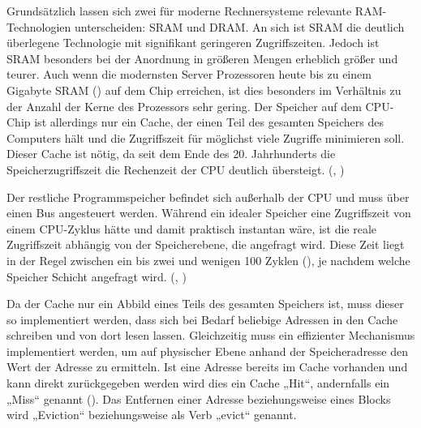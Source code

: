 Grundsätzlich lassen sich zwei für moderne Rechnersysteme
relevante \ac{RAM}-Tech\-no\-lo\-gien unterscheiden: \ac{SRAM} und
\ac{DRAM}.
An sich ist \ac{SRAM} die deutlich überlegene Technologie mit
signifikant geringeren Zugriffszeiten. Jedoch ist \ac{SRAM}
besonders bei der Anordnung in größeren Mengen erheblich größer
und teurer. Auch wenn die modernsten Server Prozessoren heute
bis zu einem Gigabyte \ac{SRAM} (\cite{noauthor_server_nodate})
auf dem Chip erreichen, ist dies besonders im Verhältnis zu der
Anzahl der Kerne des Prozessors sehr gering.
Der Speicher auf dem \ac{CPU}-Chip ist allerdings nur ein Cache,
der einen Teil des gesamten Speichers des Computers hält und
die Zugriffszeit für möglichst viele Zugriffe minimieren soll.
Dieser Cache ist nötig, da seit dem Ende des 20. Jahrhunderts
die Speicherzugriffszeit die Rechenzeit der \ac{CPU} deutlich
übersteigt.
(\cite[37,38]{handy_cache_1993}, \cite[13]{hat_what_2007})

Der restliche Programmspeicher befindet sich außerhalb der \ac{CPU}
und muss über einen Bus angesteuert werden. Während ein idealer
Speicher eine Zugriffszeit von einem \ac{CPU}-Zyklus hätte und
damit praktisch instantan wäre, ist die reale Zugriffszeit
abhängig von der Speicherebene, die angefragt wird. Diese Zeit
liegt in der Regel zwischen ein bis zwei und wenigen 100 Zyklen
(\cite[723,724]{yarom_flushreload_2014}),
je nachdem welche Speicher Schicht angefragt wird.
(\cite[16]{hat_what_2007}, \cite[534]{sarangi_basic_2021})

Da der Cache nur ein Abbild eines Teils des gesamten Speichers
ist, muss
dieser so implementiert werden, dass sich bei Bedarf beliebige
Adressen in den Cache schreiben und von dort lesen lassen.
Gleichzeitig muss ein effizienter Mechanismus implementiert
werden, um auf physischer Ebene anhand der Speicheradresse den
Wert der Adresse zu ermitteln. Ist eine Adresse bereits im Cache
vorhanden und kann direkt zurückgegeben werden wird dies ein
Cache „Hit“, andernfalls ein „Miss“ genannt
(\cite[514]{sarangi_basic_2021}). Das Entfernen
einer Adresse beziehungsweise eines Blocks wird „Eviction“
beziehungsweise als Verb „evict“ genannt.

